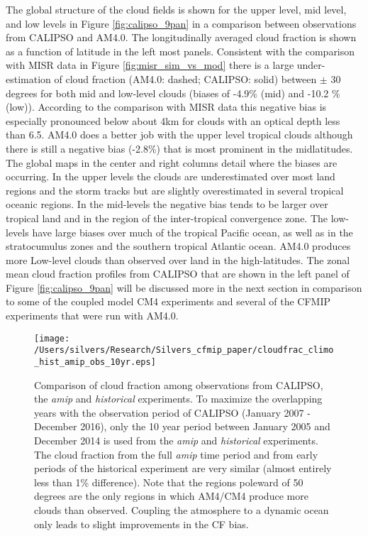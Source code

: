 \documentclass[draft]{agujournal2019}
\begin{document}
The global structure of the cloud fields is shown for the upper level, mid level, and low levels in 
Figure \ref{fig:calipso_9pan} in a comparison between observations from CALIPSO and AM4.0.
The longitudinally averaged cloud fraction is shown as a function of latitude in the left most panels.  
Consistent with the comparison with MISR data in Figure \ref{fig:misr_sim_vs_mod} there is a large under-estimation 
of cloud fraction (AM4.0: dashed; CALIPSO: solid) between 
$\pm$ 30 degrees for both mid and low-level clouds (biases of -4.9\% (mid) and -10.2 \% (low)). 
According to the comparison with MISR data this negative bias is especially pronounced below about 4km
for clouds with an optical depth less than 6.5.    
AM4.0 does a better job with the upper level tropical clouds although there is still a negative bias (-2.8\%) 
that is most prominent in the midlatitudes.   
The global maps  in the center and right columns detail where the biases are occurring.  
In the upper levels the clouds are underestimated over most land regions and the storm tracks but are 
slightly overestimated in several tropical oceanic regions.  In the mid-levels the negative bias tends to be larger 
over tropical land and in the region of the inter-tropical convergence zone.  
The low-levels have large biases over much of the tropical Pacific ocean, as well as in the stratocumulus zones 
and the southern tropical Atlantic ocean.   
AM4.0 produces more Low-level clouds than observed over land in the high-latitudes.  
The zonal mean cloud fraction profiles from CALIPSO that are shown in the left panel of  Figure \ref{fig:calipso_9pan}
will be discussed more in the next section in comparison to some of the coupled model CM4 experiments and
several of the CFMIP experiments that were run with AM4.0.  

\begin{figure}
  \centering
  \texttt{[image: /Users/silvers/Research/Silvers\_cfmip\_paper/cloudfrac\_climo\_hist\_amip\_obs\_10yr.eps]}
  \caption{Comparison of cloud fraction among observations from CALIPSO, the \textit{amip} and 
  \textit{historical} experiments.  To maximize the overlapping years with the observation period of CALIPSO
  (January 2007 - December 2016), only the 10 year period between January 2005 and December 2014 is
  used from the \textit{amip} and  \textit{historical} experiments.  The cloud fraction from the full \textit{amip}
  time period and from early periods of the historical experiment are very similar 
  (almost entirely less than 1\% difference).   Note that the regions poleward of
  50 degrees are the only regions in which AM4/CM4 produce more clouds than observed.  
  Coupling the atmosphere to a dynamic ocean only leads to slight improvements in the CF bias.}
  \label{fig:calipso_amip_historical}
\end{figure}
\end{document}
